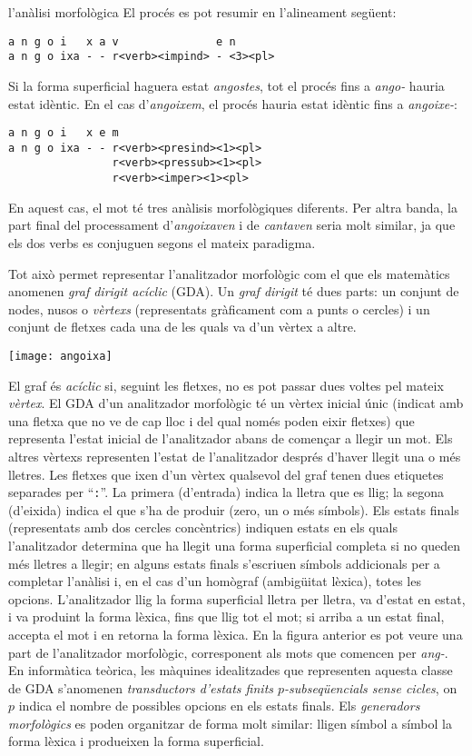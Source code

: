 \begin{persabermes}{l'anàlisi morfològica}
El procés es pot resumir en l'alineament següent:
\begin{verbatim}
a n g o i   x a v               e n
a n g o ixa - - r<verb><impind> - <3><pl>
\end{verbatim}
Si la forma superficial haguera estat \emph{angostes}, tot el procés
fins a \emph{ango-} hauria estat idèntic. En el cas d'{\em angoixem},
el procés hauria estat idèntic fins a {\em angoixe-}:
\begin{verbatim}
a n g o i   x e m
a n g o ixa - - r<verb><presind><1><pl>
                r<verb><pressub><1><pl>
                r<verb><imper><1><pl> 
\end{verbatim}
En aquest cas, el mot té tres anàlisis morfològiques diferents.  Per
altra banda, la part final del processament d'\emph{angoixaven} i de
\emph{cantaven} seria molt similar, ja que els dos verbs es conjuguen
segons el mateix paradigma.

Tot això permet representar l'analitzador morfològic com el que els
matemàtics anomenen \emph{graf dirigit acíclic} (GDA). Un \emph{graf
  dirigit} té dues parts: un conjunt de nodes, nusos o \emph{vèrtexs}
(representats gràficament com a punts o cercles) i un conjunt de
fletxes cada una de les quals va d'un vèrtex a altre.

\texttt{[image: angoixa]}

El graf és \emph{acíclic} si, seguint les fletxes, no es pot passar
dues voltes pel mateix \emph{vèrtex}. El GDA d'un analitzador
morfològic té un vèrtex inicial únic (indicat amb una fletxa que no ve
de cap lloc i del qual només poden eixir fletxes) que representa
l'estat inicial de l'analitzador abans de començar a llegir un
mot. Els altres vèrtexs representen l'estat de l'analitzador després
d'haver llegit una o més lletres. Les fletxes que ixen d'un vèrtex
qualsevol del graf tenen dues etiquetes separades per ``{\tt :}''. La
primera (d'entrada) indica la lletra que es llig; la segona (d'eixida)
indica el que s'ha de produir (zero, un o més símbols). Els estats
finals (representats amb dos cercles concèntrics) indiquen estats en
els quals l'analitzador determina que ha llegit una forma superficial
completa si no queden més lletres a llegir; en alguns estats finals
s'escriuen símbols addicionals per a completar l'anàlisi i, en el cas
d'un homògraf (ambigüitat lèxica), totes les opcions. L'analitzador
llig la forma superficial lletra per lletra, va d'estat en estat, i va
produint la forma lèxica, fins que llig tot el mot; si arriba a un
estat final, accepta el mot i en retorna la forma lèxica. En la figura
anterior es pot veure una part de l'analitzador morfològic,
corresponent als mots que comencen per \emph{ang-}. En informàtica
teòrica, les màquines idealitzades que representen aquesta classe de
GDA s'anomenen \emph{transductors d'estats finits $p$-subseqüencials
  sense cicles}, on $p$ indica el nombre de possibles opcions en els
estats finals. Els \emph{generadors morfològics} es poden organitzar
de forma molt similar: lligen símbol a símbol la forma lèxica i
produeixen la forma superficial.
\end{persabermes}

